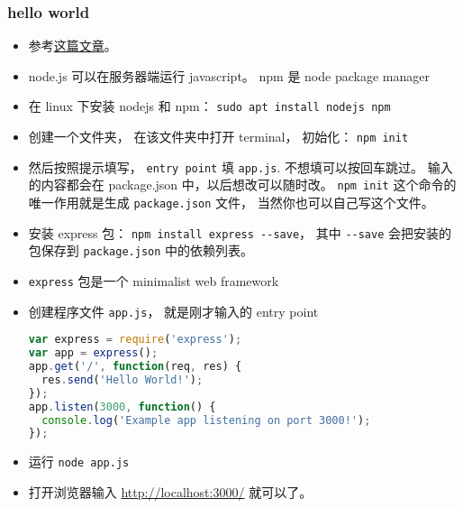 
\begin{issues}
\issueDraft
\end{issues}


\subsubsection{hello world}
\begin{itemize}
\item 参考\href{https://medium.com/@adnanrahic/hello-world-app-with-node-js-and-express-c1eb7cfa8a30}{这篇文章}。
\item node.js 可以在服务器端运行 javascript。 npm 是 node package manager
\item 在 linux 下安装 nodejs 和 npm： \verb|sudo apt install nodejs npm|
\item 创建一个文件夹， 在该文件夹中打开 terminal， 初始化： \verb|npm init|
\item 然后按照提示填写， \verb|entry point| 填 \verb`app.js`. 不想填可以按回车跳过。 输入的内容都会在 package.json 中，以后想改可以随时改。 \verb|npm init| 这个命令的唯一作用就是生成 \verb`package.json` 文件， 当然你也可以自己写这个文件。
\item 安装 express 包： \verb|npm install express --save|， 其中 \verb|--save| 会把安装的包保存到 \verb|package.json| 中的依赖列表。
\item \verb|express| 包是一个 minimalist web framework
\item 创建程序文件 \verb|app.js|， 就是刚才输入的 entry point
\begin{lstlisting}[language=js]
var express = require('express');
var app = express();
app.get('/', function(req, res) {
  res.send('Hello World!');
});
app.listen(3000, function() {
  console.log('Example app listening on port 3000!');
});
\end{lstlisting}
\item 运行 \verb|node app.js|
\item 打开浏览器输入 \href{http://localhost:3000/}{http://localhost:3000/} 就可以了。
\end{itemize}
